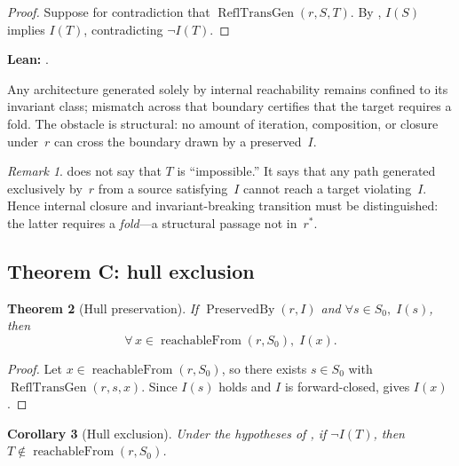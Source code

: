 \documentclass[11pt]{article}
\theoremstyle{plain}
\newtheorem{theorem}{Theorem}[section]
\newtheorem{corollary}[theorem]{Corollary}
\theoremstyle{definition}
\theoremstyle{remark}
\newtheorem{remark}[theorem]{Remark}
\newcommand{\ReflTransGen}{\operatorname{ReflTransGen}}
\newcommand{\PreservedBy}{\operatorname{PreservedBy}}
\newcommand{\reachableFrom}{\operatorname{reachableFrom}}
\begin{document}
\begin{proof}
Suppose for contradiction that $\ReflTransGen(r,S,T)$.
By , $I(S)$ implies $I(T)$, contradicting $\lnot I(T)$.
\end{proof}

\smallskip
\noindent\textbf{Lean:}
.

\begin{keybox}[title={The master obstruction}]
Any architecture generated solely by internal reachability remains confined to its
invariant class; mismatch across that boundary certifies that the target requires a
fold.  The obstacle is structural: no amount of iteration, composition, or closure
under~$r$ can cross the boundary drawn by a preserved~$I$.
\end{keybox}

\begin{remark}\label{rem:interpretation}
 does not say that $T$ is ``impossible.''  It says that any
path generated exclusively by~$r$ from a source satisfying~$I$ cannot reach a target
violating~$I$.  Hence internal closure and invariant-breaking transition must be
distinguished: the latter requires a \emph{fold}---a structural passage not in~$r^{*}$.
\end{remark}

\subsection*{Theorem C: hull exclusion}

\begin{theorem}[Hull preservation]\label{thm:hull-preservation}
If $\PreservedBy(r,I)$ and $\forall s \in S_0,\; I(s)$, then
\[
  \forall\, x \in \reachableFrom(r, S_0),\; I(x).
\]
\end{theorem}

\begin{proof}
Let $x \in \reachableFrom(r,S_0)$, so there exists $s \in S_0$ with
$\ReflTransGen(r,s,x)$.  Since $I(s)$ holds and $I$ is forward-closed,
 gives $I(x)$.
\end{proof}

\begin{corollary}[Hull exclusion]\label{cor:hull-exclusion}
Under the hypotheses of , if $\lnot I(T)$, then
$T \notin \reachableFrom(r,S_0)$.
\end{corollary}
\end{document}
